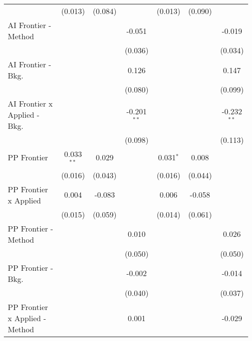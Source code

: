 \begin{tabular}{lcccccc}
                                  & (0.013)      & (0.084)       &               & (0.013)     & (0.090)      &   \\   
   AI Frontier - Method           &              &               & -0.051        &             &              & -0.019\\   
                                  &              &               & (0.036)       &             &              & (0.034)\\   
   AI Frontier - Bkg.             &              &               & 0.126         &             &              & 0.147\\   
                                  &              &               & (0.080)       &             &              & (0.099)\\   
   AI Frontier x Applied - Bkg.   &              &               & -0.201$^{**}$ &             &              & -0.232$^{**}$\\   
                                  &              &               & (0.098)       &             &              & (0.113)\\   
   PP Frontier                    & 0.033$^{**}$ & 0.029         &               & 0.031$^{*}$ & 0.008        &   \\   
                                  & (0.016)      & (0.043)       &               & (0.016)     & (0.044)      &   \\   
   PP Frontier x Applied          & 0.004        & -0.083        &               & 0.006       & -0.058       &   \\   
                                  & (0.015)      & (0.059)       &               & (0.014)     & (0.061)      &   \\   
   PP Frontier - Method           &              &               & 0.010         &             &              & 0.026\\   
                                  &              &               & (0.050)       &             &              & (0.050)\\   
   PP Frontier - Bkg.             &              &               & -0.002        &             &              & -0.014\\   
                                  &              &               & (0.040)       &             &              & (0.037)\\   
   PP Frontier x Applied - Method &              &               & 0.001         &             &              & -0.029\\   

\end{tabular}

